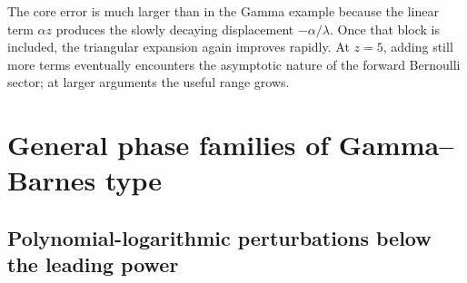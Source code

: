 \documentclass[11pt,oneside]{article}
\theoremstyle{plain}
\theoremstyle{definition}
\theoremstyle{remark}
\newcommand{\Bcal}{\mathcal{B}}
\begin{document}
\begin{table}[htbp]
\centering
\small
\caption{Signed errors (approximation minus exact value) for \(\Bcal(y)\), where \(y=G(z+1)\).}
\label{tab:barnes-errors}
\end{table}

The core error is much larger than in the Gamma example because the linear
term \(\alpha z\) produces the slowly decaying displacement
\(-\alpha/\lambda\).  Once that block is included, the triangular expansion
again improves rapidly.  At \(z=5\), adding still more terms eventually
encounters the asymptotic nature of the forward Bernoulli sector; at larger
arguments the useful range grows.

\section{General phase families of Gamma--Barnes type}
\label{sec:general-families}

\subsection{Polynomial-logarithmic perturbations below the leading power}
\end{document}

